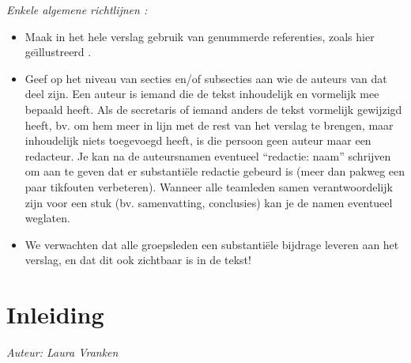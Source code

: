 \documentclass[tt]{penoverslag}
\begin{document}
\maketitlepage


\begin{abstract}
{\em Vat kort samen waar dit verslag over gaat, en wat er in de tekst beschreven staat.}\\

\end{abstract}


\tableofcontents\newpage

\em Enkele algemene richtlijnen : 
\begin{itemize}
\item Maak in het hele verslag gebruik van genummerde referenties, zoals hier ge\"\i llustreerd \cite{website:wikibooks-biblio}.  
\item Geef op het niveau van secties en/of subsecties aan wie de auteurs van dat deel zijn.  Een auteur is iemand die de tekst inhoudelijk en vormelijk mee bepaald heeft.    Als de secretaris of iemand anders de tekst vormelijk gewijzigd heeft, bv. om hem meer in lijn met de rest van het verslag te brengen, maar inhoudelijk niets toegevoegd heeft, is die persoon geen auteur maar een redacteur.  Je kan na de auteursnamen eventueel ``redactie: naam'' schrijven om aan te geven dat er substanti\"ele redactie gebeurd is (meer dan pakweg een paar tikfouten verbeteren).  Wanneer alle teamleden samen verantwoordelijk zijn voor een stuk (bv. samenvatting, conclusies) kan je de namen eventueel weglaten.
\item We verwachten dat alle groepsleden een substanti\"ele bijdrage leveren aan het  verslag, en dat dit ook zichtbaar is in de tekst!
\end{itemize}

\rm 

\section{Inleiding}


{\em Auteur: Laura Vranken}\\
\end{document}
